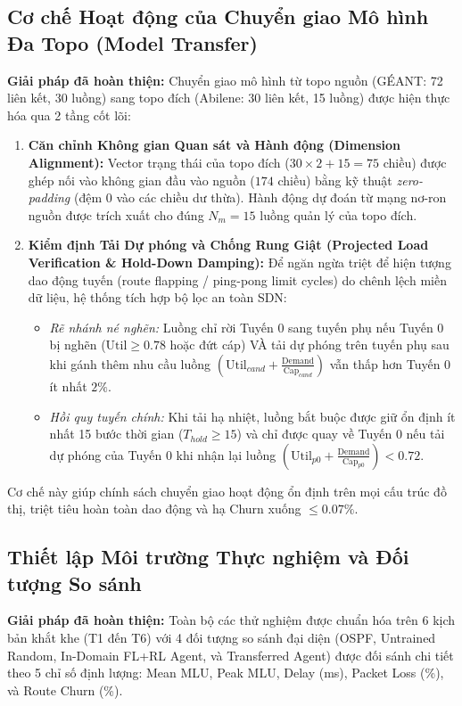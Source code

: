 \documentclass[11pt,a4paper]{article}
\begin{document}
\subsection{Cơ chế Hoạt động của Chuyển giao Mô hình Đa Topo (Model Transfer)}
\textbf{Giải pháp đã hoàn thiện:} Chuyển giao mô hình từ topo nguồn (GÉANT: 72 liên kết, 30 luồng) sang topo đích (Abilene: 30 liên kết, 15 luồng) được hiện thực hóa qua 2 tầng cốt lõi:
\begin{enumerate}
    \item \textbf{Căn chỉnh Không gian Quan sát và Hành động (Dimension Alignment):} Vector trạng thái của topo đích ($30 \times 2 + 15 = 75$ chiều) được ghép nối vào không gian đầu vào nguồn ($174$ chiều) bằng kỹ thuật \textit{zero-padding} (đệm 0 vào các chiều dư thừa). Hành động dự đoán từ mạng nơ-ron nguồn được trích xuất cho đúng $N_m=15$ luồng quản lý của topo đích.
    \item \textbf{Kiểm định Tải Dự phóng và Chống Rung Giật (Projected Load Verification \& Hold-Down Damping):} Để ngăn ngừa triệt để hiện tượng dao động tuyến (route flapping / ping-pong limit cycles) do chênh lệch miền dữ liệu, hệ thống tích hợp bộ lọc an toàn SDN:
    \begin{itemize}
        \item \textit{Rẽ nhánh né nghẽn:} Luồng chỉ rời Tuyến 0 sang tuyến phụ nếu Tuyến 0 bị nghẽn ($\text{Util} \ge 0.78$ hoặc đứt cáp) VÀ tải dự phóng trên tuyến phụ sau khi gánh thêm nhu cầu luồng $\left(\text{Util}_{cand} + \frac{\text{Demand}}{\text{Cap}_{cand}}\right)$ vẫn thấp hơn Tuyến 0 ít nhất $2\%$.
        \item \textit{Hồi quy tuyến chính:} Khi tải hạ nhiệt, luồng bắt buộc được giữ ổn định ít nhất 15 bước thời gian ($T_{hold} \ge 15$) và chỉ được quay về Tuyến 0 nếu tải dự phóng của Tuyến 0 khi nhận lại luồng $\left(\text{Util}_{p0} + \frac{\text{Demand}}{\text{Cap}_{p0}}\right) < 0.72$.
    \end{itemize}
\end{enumerate}
Cơ chế này giúp chính sách chuyển giao hoạt động ổn định trên mọi cấu trúc đồ thị, triệt tiêu hoàn toàn dao động và hạ Churn xuống $\le 0.07\%$.

\subsection{Thiết lập Môi trường Thực nghiệm và Đối tượng So sánh}
\textbf{Giải pháp đã hoàn thiện:} Toàn bộ các thử nghiệm được chuẩn hóa trên 6 kịch bản khắt khe (T1 đến T6) với 4 đối tượng so sánh đại diện (OSPF, Untrained Random, In-Domain FL+RL Agent, và Transferred Agent) được đối sánh chi tiết theo 5 chỉ số định lượng: Mean MLU, Peak MLU, Delay (ms), Packet Loss (\%), và Route Churn (\%).
\end{document}

